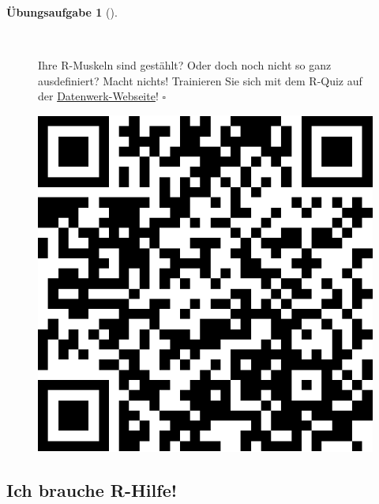 \documentclass[
  letterpaper,
]{scrbook}
\theoremstyle{definition}
\newtheorem{exercise}{Übungsaufgabe}[chapter]
\theoremstyle{definition}
\theoremstyle{definition}
\theoremstyle{remark}
\begin{document}
\begin{exercise}[]\protect\hypertarget{exr-rquiz}{}\label{exr-rquiz}

~

\begin{figure}

\begin{minipage}{0.80\linewidth}
Ihre R-Muskeln sind gestählt? Oder doch noch nicht so ganz ausdefiniert?
Macht nichts! Trainieren Sie sich mit dem R-Quiz auf der
\href{https://sebastiansauer.github.io/Datenwerk/posts/r-quiz/r-quiz}{Datenwerk-Webseite}!
\(\square\)\end{minipage}%
%
\begin{minipage}{0.20\linewidth}

\begin{center}
\includegraphics[width=0.75\linewidth,height=\textheight,keepaspectratio]{020-R_files/figure-pdf/unnamed-chunk-24-1.pdf}
\end{center}

\end{minipage}%

\end{figure}%

\end{exercise}

\subsection{Ich brauche R-Hilfe!}\label{r-faq}
\end{document}
